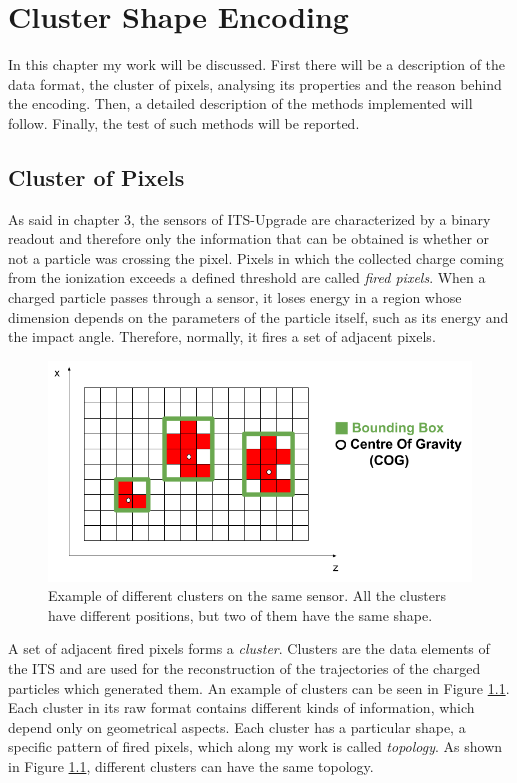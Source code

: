 \chapter{Cluster Shape Encoding}
In this chapter my work will be discussed. First there will be a description of the data format, the cluster of pixels, analysing its properties and the reason behind the encoding. Then, a detailed description of the methods implemented will follow. Finally, the test of such methods will be reported.
\section{Cluster of Pixels}
\label{sec:cluster}
As said in chapter 3, the sensors of ITS-Upgrade are characterized by a binary readout and therefore only the information that can be obtained is whether or not a particle was crossing the pixel. Pixels in which the collected charge coming from the ionization exceeds a defined threshold are called \textit{fired pixels}. When a charged particle passes through a sensor, it loses energy in a region whose dimension depends on the parameters of the particle itself, such as its energy and the impact angle. Therefore, normally, it fires a set of adjacent pixels.\\
%
\begin{figure}
  \centering
  \includegraphics[scale=0.55]{figures/cluster.png}
  \caption{Example of different clusters on the same sensor. All the clusters have different positions, but two of them have the same shape.}
  \label{fig:clusters}
\end{figure}
%
A set of adjacent fired pixels forms a \textit{cluster}. Clusters are the data elements of the ITS and are used for the reconstruction of the trajectories of the charged particles which generated them. An example of clusters can be seen in Figure \ref{fig:clusters}. Each cluster in its raw format contains different kinds of information, which depend only on geometrical aspects. Each cluster has a particular shape, a specific pattern of fired pixels, which along my work is called \textit{topology}. As shown in Figure \ref{fig:clusters}, different clusters can have the same topology.\\
